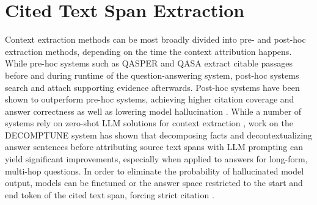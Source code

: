 \section{Cited Text Span Extraction}
Context extraction methods can be most broadly divided into pre- and post-hoc extraction methods, depending on the time the context attribution happens. While pre-hoc systems such as QASPER \cite{qasper} and QASA \cite{qasa} extract citable passages before and during runtime of the question-answering system, post-hoc systems search and attach supporting evidence afterwards. Post-hoc systems have been shown to outperform pre-hoc systems, achieving higher citation coverage and answer correctness as well as lowering model hallucination \cite{generationTimeVsPostHocCitation}. 
While a number of systems rely on  zero-shot LLM solutions for context extraction \cite{onSynthesizingDataForContextAttributionInQuestionAnswering} \cite{whereDidThatComeFrom} \cite{ContextBasedQuotationRecommendation}, work on the DECOMPTUNE \cite{decompositionEnhancedTraining} system has shown that decomposing facts and decontextualizing answer sentences before attributing source text spans with LLM prompting can yield significant improvements, especially when applied to answers for long-form, multi-hop questions. In order to eliminate the probability of hallucinated model output, models can be finetuned \cite{citationContextExtractionUsingTransformerBasedModel} or the answer space restricted to the start and end token of the cited text span, forcing strict citation \cite{citationContextExtractionUsingTransformerBasedModel}.


